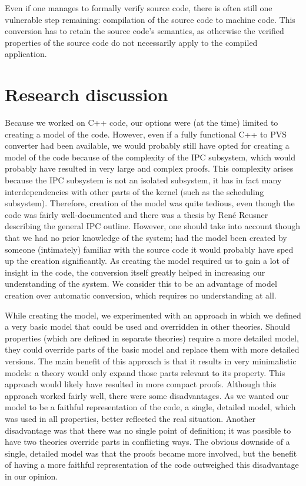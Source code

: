 Even if one manages to formally verify source code, there is often still one vulnerable step remaining: compilation of the source code to machine code. This conversion has to retain the source code's semantics, as otherwise the verified properties of the source code do not necessarily apply to the compiled application.

\section{Research discussion}
Because we worked on C++ code, our options were (at the time) limited to creating a model of the code. However, even if a fully functional C++ to PVS converter had been available, we would probably still have opted for creating a model of the code because of the complexity of the IPC subsystem, which would probably have resulted in very large and complex proofs. This complexity arises because the IPC subsystem is not an isolated subsystem, it has in fact many interdependencies with other parts of the kernel (such as the scheduling subsystem). Therefore, creation of the model was quite tedious, even though the code was fairly well-documented and there was a thesis by Ren\'e Reusner describing the general IPC outline. However, one should take into account though that we had no prior knowledge of the system; had the model been created by someone (intimately) familiar with the source code it would probably have sped up the creation significantly. As creating the model required us to gain a lot of insight in the code, the conversion itself greatly helped in increasing our understanding of the system. We consider this to be an advantage of model creation over automatic conversion, which requires no understanding at all.\emptyline

While creating the model, we experimented with an approach in which we defined a very basic model that could be used and overridden in other theories. Should properties (which are defined in separate theories) require a more detailed model, they could override parts of the basic model and replace them with more detailed versions. The main benefit of this approach is that it results in very minimalistic models: a theory would only expand those parts relevant to its property. This approach would likely have resulted in more compact proofs. Although this approach worked fairly well, there were some disadvantages. As we wanted our model to be a faithful representation of the code, a single, detailed model, which was used in all properties, better reflected the real situation. Another disadvantage was that there was no single point of definition; it was possible to have two theories override parts in conflicting ways. The obvious downside of a single, detailed model was that the proofs became more involved, but the benefit of having a more faithful representation of the code outweighed this disadvantage in our opinion.\emptyline

